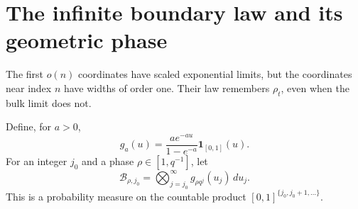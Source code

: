 \documentclass[11pt,a4paper]{article}
\numberwithin{equation}{section}
\theoremstyle{definition}
\theoremstyle{remark}
\newcommand{\ind}{\mathbf 1}
\begin{document}
\section{The infinite boundary law and its geometric phase}
\label{sec:boundary}
The first $o(n)$ coordinates have scaled exponential limits, but the
coordinates near index $n$ have widths of order one. Their law
remembers $\rho_t$, even when the bulk limit does not.

Define, for $a>0$,
\begin{equation}\label{eq:g-density}
 g_a(u)=\frac{ae^{-au}}{1-e^{-a}}\ind_{[0,1]}(u).
\end{equation}
For an integer $j_0$ and a phase $\rho\in[1,q^{-1}]$, let
\begin{equation}\label{eq:boundary-product}
 \mathcal B_{\rho,j_0}=\bigotimes_{j=j_0}^{\infty}g_{\rho q^j}(u_j)\,du_j.
\end{equation}
This is a probability measure on the countable product
$[0,1]^{\{j_0,j_0+1,\ldots\}}$.
\end{document}
